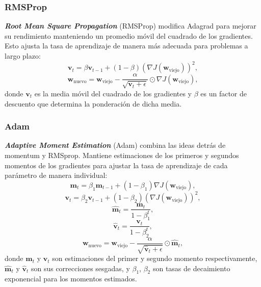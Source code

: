 \subsubsection{RMSProp}

\textbf{\textit{Root Mean Square Propagation}} (RMSProp) \cite{hinton2012lecture} modifica Adagrad para mejorar su rendimiento manteniendo un promedio móvil del cuadrado de los gradientes. Esto ajusta la tasa de aprendizaje de manera más adecuada para problemas a largo plazo:
\begin{equation}
	\mathbf{v}_{t} = \beta \mathbf{v}_{t-1} + (1 - \beta) (\nabla J(\mathbf{w}_{\text{viejo}}))^2,
\end{equation}
\begin{equation}
	\mathbf{w}_{\text{nuevo}} = \mathbf{w}_{\text{viejo}} - \frac{\alpha}{\sqrt{\mathbf{v}_{t} + \epsilon}} \odot \nabla J(\mathbf{w}_{\text{viejo}}),
\end{equation}
donde \(\mathbf{v}_{t}\) es la media móvil del cuadrado de los gradientes y \(\beta\) es un factor de descuento que determina la ponderación de dicha media.

\subsubsection{Adam}

\textbf{\textit{Adaptive Moment Estimation}} (Adam) \cite{kingma2014adam} combina las ideas detrás de momentum y RMSprop. Mantiene estimaciones de los primeros y segundos momentos de los gradientes para ajustar la tasa de aprendizaje de cada parámetro de manera individual:
\begin{equation}
	\mathbf{m}_{t} = \beta_1 \mathbf{m}_{t-1} + (1 - \beta_1)\nabla J(\mathbf{w}_{\text{viejo}}),
\end{equation}
\begin{equation}
	\mathbf{v}_{t} = \beta_2 \mathbf{v}_{t-1} + (1 - \beta_2)(\nabla J(\mathbf{w}_{\text{viejo}}))^2,
\end{equation}
\begin{equation}
	\hat{\mathbf{m}}_{t} = \frac{\mathbf{m}_{t}}{1 - \beta_1^t},
\end{equation}
\begin{equation}
	\hat{\mathbf{v}}_{t} = \frac{\mathbf{v}_{t}}{1 - \beta_2^t},
\end{equation}
\begin{equation}
	\mathbf{w}_{\text{nuevo}} = \mathbf{w}_{\text{viejo}} - \frac{\alpha}{\sqrt{\hat{\mathbf{v}}_{t} + \epsilon}} \odot \hat{\mathbf{m}}_{t},
\end{equation}
donde \(\mathbf{m}_{t}\) y \(\mathbf{v}_{t}\) son estimaciones del primer y segundo momento respectivamente, \(\hat{\mathbf{m}}_{t}\) y \(\hat{\mathbf{v}}_{t}\) son sus correcciones sesgadas, y \(\beta_1\), \(\beta_2\) son tasas de decaimiento exponencial para los momentos estimados.

